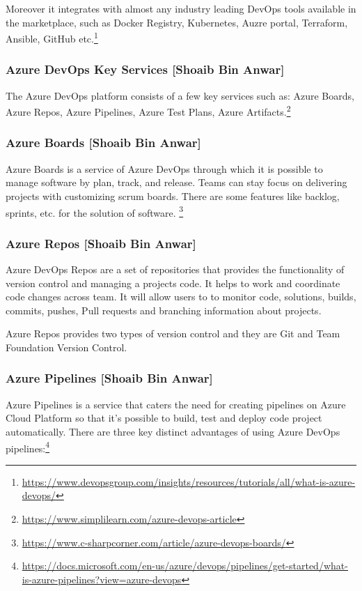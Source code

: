 Moreover it integrates with almost any industry leading DevOps tools available in the marketplace, such as Docker Registry, Kubernetes, Auzre portal, Terraform, Ansible, GitHub etc.\footnote{\url{https://www.devopsgroup.com/insights/resources/tutorials/all/what-is-azure-devops/}}
%

\subsubsection{Azure DevOps Key Services [Shoaib Bin Anwar]}
%
The Azure DevOps platform consists of a few key services such as: Azure Boards, Azure Repos, Azure Pipelines, Azure Test Plans, Azure Artifacts.\footnote{\url{https://www.simplilearn.com/azure-devops-article}}

%

\subsubsection{Azure Boards [Shoaib Bin Anwar]}
%
Azure Boards is a service of Azure DevOps through which it is possible to manage software by plan, track, and release. Teams can stay focus on delivering projects with customizing scrum boards. There are some features like backlog, sprints, etc. for the solution of software. \footnote{\url{https://www.c-sharpcorner.com/article/azure-devops-boards/}}
%
\subsubsection{Azure Repos [Shoaib Bin Anwar]}
%
Azure DevOps Repos are a set of repositories that provides the functionality of version control and managing a projects code. It helps to work and coordinate code changes across team. It will allow users to to monitor code, solutions, builds, commits, pushes, Pull requests and branching information about projects. 

Azure Repos provides two types of version control and they are Git and Team Foundation Version Control.

% 

\subsubsection{Azure Pipelines [Shoaib Bin Anwar]}
%
Azure Pipelines is a service that caters the need for creating pipelines on Azure Cloud Platform so that it's possible to build, test and deploy code project automatically. There are three key distinct advantages of using Azure DevOps pipelines:\footnote{\url{https://docs.microsoft.com/en-us/azure/devops/pipelines/get-started/what-is-azure-pipelines?view=azure-devops}}

